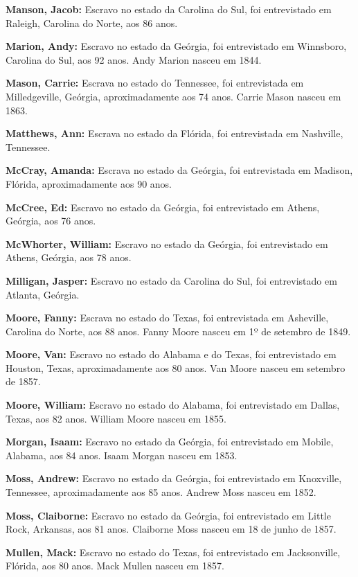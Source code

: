 \textbf{Manson, Jacob:} Escravo no estado da Carolina do Sul, foi
entrevistado em Raleigh, Carolina do Norte, aos 86 anos.

\textbf{Marion, Andy:} Escravo no estado da Geórgia, foi entrevistado em
Winnsboro, Carolina do Sul, aos 92 anos. Andy Marion nasceu em 1844.

\textbf{Mason, Carrie:} Escrava no estado do Tennessee, foi entrevistada
em Milledgeville, Geórgia, aproximadamente aos 74 anos. Carrie Mason
nasceu em 1863.

\textbf{Matthews, Ann:} Escrava no estado da Flórida, foi entrevistada
em Nashville, Tennessee.

\textbf{McCray, Amanda:} Escrava no estado da Geórgia, foi entrevistada
em Madison, Flórida, aproximadamente aos 90 anos.

\textbf{McCree, Ed:} Escravo no estado da Geórgia, foi entrevistado em
Athens, Geórgia, aos 76 anos.

\textbf{McWhorter, William:} Escravo no estado da Geórgia, foi
entrevistado em Athens, Geórgia, aos 78 anos.

\textbf{Milligan, Jasper:} Escravo no estado da Carolina do Sul, foi
entrevistado em Atlanta, Geórgia.

\textbf{Moore, Fanny:} Escrava no estado do Texas, foi entrevistada em
Asheville, Carolina do Norte, aos 88 anos. Fanny Moore nasceu em 1º de
setembro de 1849.

\textbf{Moore, Van:} Escravo no estado do Alabama e do Texas, foi
entrevistado em Houston, Texas, aproximadamente aos 80 anos. Van Moore
nasceu em setembro de 1857.

\textbf{Moore, William:} Escravo no estado do Alabama, foi entrevistado
em Dallas, Texas, aos 82 anos. William Moore nasceu em 1855.

\textbf{Morgan, Isaam:} Escravo no estado da Geórgia, foi entrevistado
em Mobile, Alabama, aos 84 anos. Isaam Morgan nasceu em 1853.

\textbf{Moss, Andrew:} Escravo no estado da Geórgia, foi entrevistado em
Knoxville, Tennessee, aproximadamente aos 85 anos. Andrew Moss nasceu em
1852.

\textbf{Moss, Claiborne:} Escravo no estado da Geórgia, foi entrevistado
em Little Rock, Arkansas, aos 81 anos. Claiborne Moss nasceu em 18 de
junho de 1857.

\textbf{Mullen, Mack:} Escravo no estado do Texas, foi entrevistado em
Jacksonville, Flórida, aos 80 anos. Mack Mullen nasceu em 1857.

